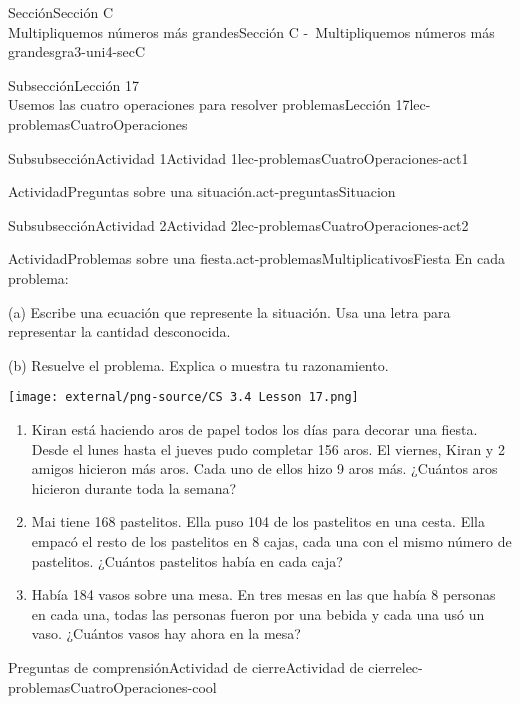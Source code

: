 \begin{sectionptx}{Sección}{{\Large Sección C\\}Multipliquemos números más grandes}{}{Sección C -~Multipliquemos números más grandes}{}{}{gra3-uni4-secC}
\begin{subsectionptx}{Subsección}{{\normalsize Lección 17\\[-0.05cm]}Usemos las cuatro operaciones para resolver problemas}{}{Lección 17}{}{}{lec-problemasCuatroOperaciones}
\begin{multicols}{2}
\begin{subsubsectionptx}{Subsubsección}{Actividad 1}{}{Actividad 1}{}{}{lec-problemasCuatroOperaciones-act1}
\begin{activity}{Actividad}{Preguntas sobre una situación.}{act-preguntasSituacion}
\vfill
\end{activity}%
\end{subsubsectionptx}
%
\end{multicols}
%
\typeout{************************************************}
\typeout{************************************************}
%
\begin{subsubsectionptx}{Subsubsección}{Actividad 2}{}{Actividad 2}{}{}{lec-problemasCuatroOperaciones-act2}
\begin{activity}{Actividad}{Problemas sobre una fiesta.}{act-problemasMultiplicativosFiesta}%
En cada problema:%
\begin{sidebyside}{2}{0.02}{0}{0.08}%
\begin{sbspanel}{0.6}%
(a) Escribe una ecuación que represente la situación. Usa una letra para representar la cantidad desconocida.%
\par
(b) Resuelve el problema. Explica o muestra tu razonamiento.%
\end{sbspanel}%
\begin{sbspanel}{0.3}%
\texttt{[image: external/png-source/CS 3.4 Lesson 17.png]}
\end{sbspanel}%
\end{sidebyside}%
%
\begin{enumerate}
\item{}Kiran está haciendo aros de papel todos los días para decorar una fiesta. Desde el lunes hasta el jueves pudo completar 156 aros. El viernes, Kiran y 2 amigos hicieron más aros. Cada uno de ellos hizo 9 aros más. ¿Cuántos aros hicieron durante toda la semana?%
\clearpage
\item{}Mai tiene 168 pastelitos. Ella puso 104 de los pastelitos en una cesta. Ella empacó el resto de los pastelitos en 8 cajas, cada una con el mismo número de pastelitos. ¿Cuántos pastelitos había en cada caja?%
\item{}Había 184 vasos sobre una mesa. En tres mesas en las que había 8 personas en cada una, todas las personas fueron por una bebida y cada una usó un vaso. ¿Cuántos vasos hay ahora en la mesa?%
\end{enumerate}
\end{activity}%
\end{subsubsectionptx}
%
%
\typeout{************************************************}
\typeout{************************************************}
%
\begin{reading-questions-subsubsection}{Preguntas de comprensión}{Actividad de cierre}{}{Actividad de cierre}{}{}{lec-problemasCuatroOperaciones-cool}

\end{reading-questions-subsubsection}
\end{subsectionptx}
\end{sectionptx}
